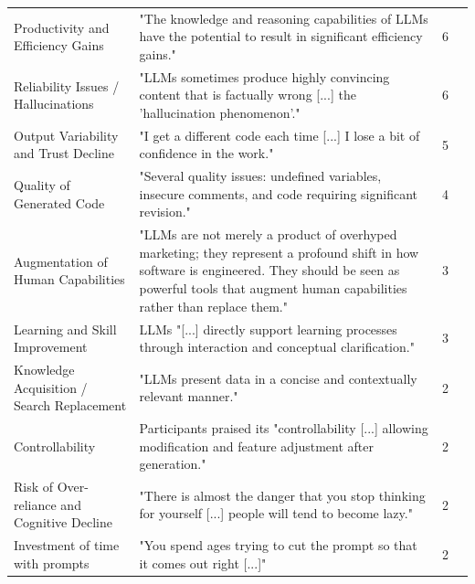 {\begin{longtable}{>{\raggedright\arraybackslash}p{3.2cm} p{8.8cm} p{0.2cm} >{\raggedright\arraybackslash}p{1.8cm}}
Productivity and Efficiency Gains & 
"The knowledge and reasoning capabilities of LLMs have the potential to result in significant efficiency gains." \cite{Banh:2025cf} & 6 & \cite{Banh:2025cf, Basha:2025tt, Terragni:2025fa, Haque:2025la, Zamfiroiu:2025ec, Han:2025mg} \\ \addlinespace
Reliability Issues / Hallucinations & "LLMs sometimes produce highly convincing content that is factually wrong [...] the 'hallucination phenomenon'." \cite{Bai:2025ci} & 6 & \cite{Bai:2025ci, Jabrw:2025ss, Durrani:2024ad, Basha:2025tt, Banh:2025cf, Pendyala:2025pi} \\ \addlinespace
Output Variability and Trust Decline & "I get a different code each time [...] I lose a bit of confidence in the work." \cite{Banh:2025cf} & 5 & \cite{Banh:2025cf, Basha:2025tt, Pendyala:2025pi, Ramos:2025aa, Terragni:2025fa} \\ \addlinespace
Quality of Generated Code & "Several quality issues: undefined variables, insecure comments, and code requiring significant revision." \cite{Jabrw:2025ss} & 4 & \cite{Terragni:2025fa, Jabrw:2025ss, Jensen:2025me, Zhang:2025ea} \\ \addlinespace
Augmentation of Human Capabilities & "LLMs are not merely a product of overhyped marketing; they represent a profound shift in how software is engineered. They should be seen as powerful tools that augment human capabilities rather than replace them." \cite{Haque:2025la} & 3 & \cite{Haque:2025la, Basha:2025tt, Terragni:2025fa} \\ \addlinespace
Learning and Skill Improvement & LLMs "[...] directly support learning processes through interaction and conceptual clarification." \cite{Zamfiroiu:2025ec} & 3 & \cite{Gao:2025cc, Zamfiroiu:2025ec, Haque:2025la} \\ \addlinespace
Knowledge Acquisition / Search Replacement & "LLMs present data in a concise and contextually relevant manner." \cite{Banh:2025cf} & 2 & \cite{Banh:2025cf, Zamfiroiu:2025ec} \\ \addlinespace
Controllability & Participants praised its "controllability [...] allowing modification and feature adjustment after generation." \cite{Zhang:2025ea} & 2 & \cite{Basha:2025tt, Zhang:2025ea} \\ \addlinespace
Risk of Over-reliance and Cognitive Decline & "There is almost the danger that you stop thinking for yourself [...] people will tend to become lazy." \cite{Banh:2025cf} & 2 & \cite{Banh:2025cf, Basha:2025tt} \\ \addlinespace
Investment of time with prompts & "You spend ages trying to cut the prompt so that it comes out right [...]" \cite{Banh:2025cf} & 2 & \cite{Banh:2025cf, Basha:2025tt} \\

\end{longtable}
}



